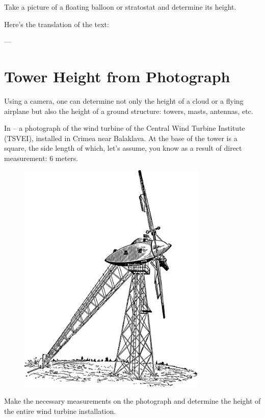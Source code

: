 Take a picture of a floating balloon or stratostat and determine its height.

Here's the translation of the text:

---

\section{Tower Height from Photograph}

\ques Using a camera, one can determine not only the height of a cloud or a flying airplane but also the height of a ground structure: towers, masts, antennas, etc.

In  -- a photograph of the wind turbine of the Central Wind Turbine Institute (TSVEI), installed in Crimea near Balaklava. At the base of the tower is a square, the side length of which, let's assume, you know as a result of direct measurement: 6 meters.

\begin{figure}[h!]
\centering
\includegraphics[width=0.8\textwidth]{figures/ch-03/fig-078.pdf}
\end{figure}

Make the necessary measurements on the photograph and determine the height of the entire wind turbine installation.


